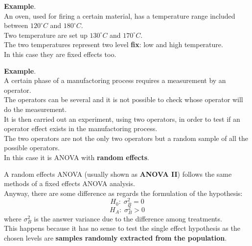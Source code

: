 \begin{frame}
  \vspace*{.5cm} 
  \textbf{Example}.\\
  \vspace*{.5cm} 
  An oven, used for firing a certain material, has a temperature range included between $120^{\circ}C$ and $180^{\circ}C$.\\
  \vspace*{.5cm} 
  Two temperature are set up $130^{\circ}C$ and $170^{\circ}C$.\\
  \vspace*{.5cm} 
  The two temperatures represent two level \textbf{fix}: low and high temperature.\\
  \vspace*{.5cm} 
  In this case they are fixed effects too.
\end{frame}

\begin{frame}
  \vspace*{.25cm} 
  \textbf{Example}.\\
  \vspace*{.25cm} 
  A certain phase of a manufactoring process requires a measurement by an operator.\\
  \vspace*{.25cm} 
  The operators can be several and it is not possible to check whose operator will do the measurement.\\
  \vspace*{.25cm} 
  It is then carried out an experiment, using two operators, in order to test if an operator effect exists in the manufactoring process.\\
  \vspace*{.25cm} 
  The two operators are not the only two operators but a random sample of all the possible operators.\\
  \vspace*{.25cm} 
  In this case it is ANOVA with \textbf{random effects}.
\end{frame}

\begin{frame}
  \vspace*{.25cm} 
  A random effects ANOVA (usually shown as \textbf{ANOVA II}) follows the same methods of a fixed effects ANOVA analysis.\\
  \vspace*{.25cm}
  Anyway, there are some difference as regards the formulation of the hypothesis:
  $$ H_0: \; \sigma^{2}_B = 0 $$
  $$ H_A: \; \sigma^{2}_B > 0 $$
  where $\sigma^{2}_B$ is the answer variance due to the difference among treatments.\\
  \vspace{.25cm}
  This happens because it has no sense to test the single effect hypothesis as the chosen levels are \textbf{samples randomly extracted from the population}.\\
\end{frame}

